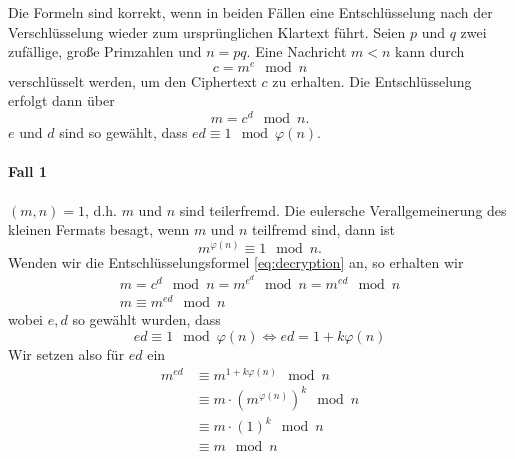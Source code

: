 Die Formeln sind korrekt, wenn in beiden Fällen eine Entschlüsselung nach der Verschlüsselung wieder zum
ursprünglichen Klartext führt.
Seien $p$ und $q$ zwei zufällige, große Primzahlen und $n=pq$. Eine Nachricht $m < n$ 
kann durch
\begin{equation}
    \label{eq:encryption}
    c = m^e\mod n
\end{equation}
verschlüsselt werden, um den Ciphertext $c$ zu erhalten. Die Entschlüsselung erfolgt dann über
\begin{equation}
    \label{eq:decryption}
    m = c^d\mod n.
\end{equation}
$e$ und $d$ sind so gewählt, dass $ed\equiv 1 \mod \varphi(n)$.
\paragraph{Fall 1} $(m,n)=1$, d.h. $m$ und $n$ sind teilerfremd. Die eulersche Verallgemeinerung
des kleinen Fermats besagt, wenn $m$ und $n$ teilfremd sind, dann ist
\begin{equation}
    m^{\varphi(n)}\equiv 1 \mod n.
\end{equation}
Wenden wir die Entschlüsselungsformel \ref{eq:decryption} an, so erhalten wir
\begin{gather*}
    m = c^d \mod n = m^{e^d} \mod n = m^{ed}\mod n\\
    m \equiv m^{ed} \mod n
\end{gather*}
wobei $e,d$ so gewählt wurden, dass
\[
    ed\equiv 1 \mod \varphi(n) \Longleftrightarrow ed = 1 + k\varphi(n)
\]
Wir setzen also für $ed$ ein
\begin{align*}
    m^{ed} &\equiv m^{1 + k\varphi(n)}\mod n\\
    &\equiv m\cdot \left(m^{\varphi(n)}\right)^k \mod n\\
    &\equiv m\cdot (1)^k \mod n\\
    &\equiv m \mod n
\end{align*}
